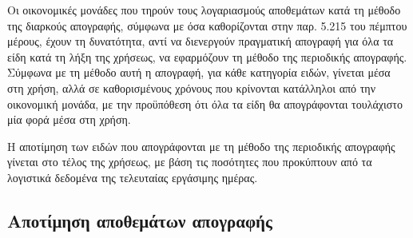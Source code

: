 \documentclass[A4,10pt,greek]{book}
\begin{document}
Οι οικονομικές μονάδες που τηρούν τους λογαριασμούς αποθεμάτων κατά τη μέθοδο της διαρκούς απογραφής, σύμφωνα με όσα καθορίζονται στην παρ. 5.215 του πέμπτου μέρους, έχουν τη δυνατότητα, αντί να διενεργούν πραγματική απογραφή για όλα τα είδη κατά τη λήξη της χρήσεως, να εφαρμόζουν τη μέθοδο της περιοδικής απογραφής. Σύμφωνα με τη μέθοδο αυτή η απογραφή, για κάθε κατηγορία ειδών, γίνεται μέσα στη χρήση, αλλά σε καθορισμένους χρόνους που κρίνονται κατάλληλοι από την οικονομική μονάδα, με την προϋπόθεση ότι όλα τα είδη θα απογράφονται τουλάχιστο μία φορά μέσα στη χρήση.

Η αποτίμηση των ειδών που απογράφονται με τη μέθοδο της περιοδικής απογραφής γίνεται στο τέλος της χρήσεως, με βάση τις ποσότητες που προκύπτουν από τα λογιστικά δεδομένα της τελευταίας εργάσιμης ημέρας.

\subsection{Αποτίμηση αποθεμάτων απογραφής}
\end{document}
